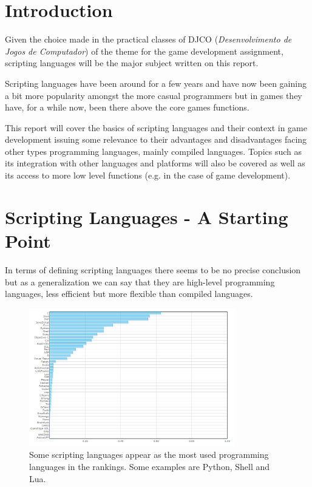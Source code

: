 \documentclass[12pt]{article}
\begin{document}

\newpage

\newpage
\section{Introduction}

Given the choice made in the practical classes of DJCO (\textit{Desenvolvimento de Jogos de Computador}) of the theme for the game development assignment, scripting languages will be the major subject written on this report.

Scripting languages have been around for a few years and have now been gaining a bit more popularity amongst the more casual programmers but in games they have, for a while now, been there above the core games functions.

This report will cover the basics of scripting languages and their context in game development issuing some relevance to their advantages and disadvantages facing other types programming languages, mainly compiled languages. Topics such as its integration with other languages and platforms will also be covered as well as its access to more low level functions (e.g. in the case of game development).\newpage


\section{Scripting Languages - A Starting Point}
In terms of defining scripting languages there seems to be no precise conclusion but as a generalization we can say that they are high-level programming languages, less efficient but more flexible than compiled languages.

\begin{figure}[h!]
    \centering
    \includegraphics[width=0.8\textwidth]{pop.PNG}
    \caption{Some scripting languages appear as the most used programming languages in the rankings. Some examples are Python, Shell and Lua.}
    \label{fig:awesome_image}
\end{figure}
\end{document}
